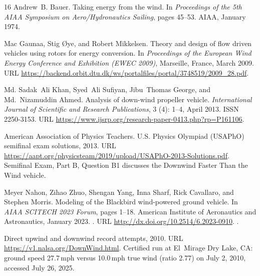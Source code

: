 \documentclass[a4paper]{article}
\begin{document}
\begin{thebibliography}{16}
Andrew~B. Bauer.
\newblock Taking energy from the wind.
\newblock In \emph{Proceedings of the 5th AIAA Symposium on Aero/Hydronautics
  Sailing}, pages 45--53. AIAA, January 1974.

Mac Gaunaa, Stig {\O}ye, and Robert Mikkelsen.
\newblock Theory and design of flow driven vehicles using rotors for energy
  conversion.
\newblock In \emph{Proceedings of the European Wind Energy Conference and
  Exhibition (EWEC 2009)}, Marseille, France, March 2009.
\newblock URL
  \url{https://backend.orbit.dtu.dk/ws/portalfiles/portal/3748519/2009_28.pdf}.

Md. Sadak~Ali Khan, Syed~Ali Sufiyan, Jibu~Thomas George, and Md.~Nizamuddin
  Ahmed.
\newblock Analysis of down-wind propeller vehicle.
\newblock \emph{International Journal of Scientific and Research Publications},
  3 (4): 1--4, April 2013.
\newblock ISSN 2250-3153.
\newblock URL \url{https://www.ijsrp.org/research-paper-0413.php?rp=P161106}.

{American Association of Physics Teachers}.
 {U}.{S}. {P}hysics {O}lympiad ({USAPhO}) semifinal exam
  solutions, 2013.
\newblock URL
  \url{https://aapt.org/physicsteam/2019/upload/USAPhO-2013-Solutions.pdf}.
 Semifinal Exam, Part B, Question B1 discusses the Downwind
  Faster Than the Wind vehicle.

Meyer Nahon, Zihao Zhuo, Shengan Yang, Inna Sharf, Rick Cavallaro, and Stephen
  Morris.
\newblock Modeling of the {B}lackbird wind-powered ground vehicle.
\newblock In \emph{AIAA SCITECH 2023 Forum}, pages 1--18. American Institute of
  Aeronautics and Astronautics, January 2023.
\newblock {}.
\newblock URL \url{http://dx.doi.org/10.2514/6.2023-0910}.
.

Direct upwind and downwind record attempts, 2010.
\newblock URL \url{https://v1.nalsa.org/DownWind.html}.
\newblock Certified run at El~Mirage Dry Lake, CA: ground speed 27.7\,mph
  versus 10.0\,mph true wind (ratio 2.77) on July 2, 2010, accessed July 26,
  2025.


\end{thebibliography}
\end{document}
